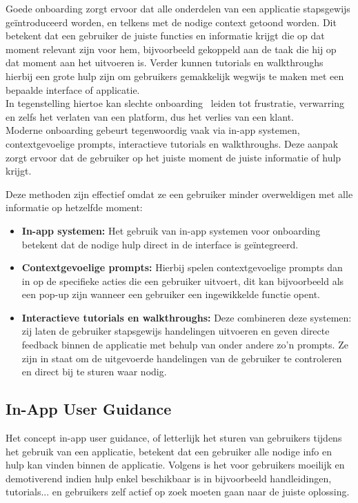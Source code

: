 Goede onboarding zorgt ervoor dat alle onderdelen van een applicatie stapsgewijs geïntroduceerd worden, en telkens met de nodige context getoond worden. Dit betekent dat een gebruiker de juiste functies en informatie krijgt die op dat moment relevant zijn voor hem, bijvoorbeeld gekoppeld aan de taak die hij op dat moment aan het uitvoeren is. Verder kunnen tutorials en walkthroughs hierbij een grote hulp zijn om gebruikers gemakkelijk wegwijs te maken met een bepaalde interface of applicatie.
\autocite{Kedzielska2023}
\autocite{Melenciano2025}
\\

In tegenstelling hiertoe kan slechte onboarding  leiden tot frustratie, verwarring en zelfs het verlaten van een platform, dus het verlies van een klant.
\autocite{CascaesCardoso2017}
\\

Moderne onboarding gebeurt tegenwoordig vaak via in-app systemen, contextgevoelige prompts, interactieve tutorials en walkthroughs. Deze aanpak zorgt ervoor dat de gebruiker op het juiste moment de juiste informatie of hulp krijgt. \autocite{Acar2020, Akiki2019}

Deze methoden zijn effectief omdat ze een gebruiker minder overweldigen met alle informatie op hetzelfde moment:
\begin{itemize}
	\item \textbf{In-app systemen:} Het gebruik van in-app systemen voor onboarding betekent dat de nodige hulp direct in de interface is geïntegreerd.
	\item \textbf{Contextgevoelige prompts:} Hierbij spelen contextgevoelige prompts dan in op de specifieke acties die een gebruiker uitvoert, dit kan bijvoorbeeld als een pop-up zijn wanneer een gebruiker een ingewikkelde functie opent.
	\item \textbf{Interactieve tutorials en walkthroughs:} Deze combineren deze systemen: zij laten de gebruiker stapsgewijs handelingen uitvoeren en geven directe feedback binnen de applicatie met behulp van onder andere zo'n prompts. Ze zijn in staat om de uitgevoerde handelingen van de gebruiker te controleren en direct bij te sturen waar nodig.
\end{itemize}

\subsection{In-App User Guidance}
Het concept in-app user guidance, of letterlijk het sturen van gebruikers tijdens het gebruik van een applicatie, betekent dat een gebruiker alle nodige info en hulp kan vinden binnen de applicatie. Volgens \textcite{Acar2020} is het voor gebruikers moeilijk en demotiverend indien hulp enkel beschikbaar is in bijvoorbeeld handleidingen, tutorials... en gebruikers zelf actief op zoek moeten gaan naar de juiste oplossing.
\\

